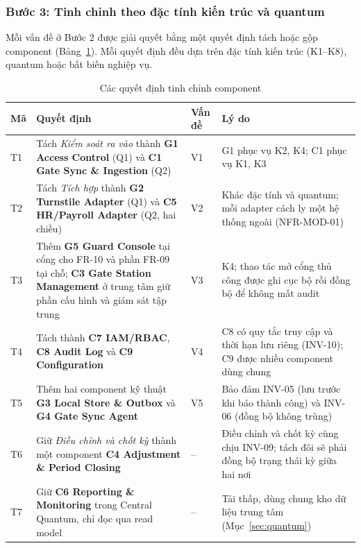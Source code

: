 \subsubsection{Bước 3: Tinh chỉnh theo đặc tính kiến trúc và quantum}\label{sec:logical-step3}
Mỗi vấn đề ở Bước 2 được giải quyết bằng một quyết định tách hoặc gộp component (Bảng~\ref{tab:logical-refinement}). Mỗi quyết định đều dựa trên đặc tính kiến trúc (K1--K8), quantum hoặc bất biến nghiệp vụ.

\begin{table}[H]
\centering
\caption{Các quyết định tinh chỉnh component}\label{tab:logical-refinement}
\small
\renewcommand{\arraystretch}{1.3}
\begin{tabularx}{\textwidth}{|>{\centering\arraybackslash}p{0.8cm}|>{\raggedright\arraybackslash}X|>{\centering\arraybackslash}p{1.4cm}|>{\raggedright\arraybackslash}p{4.4cm}|}
\hline
\textbf{Mã} & \textbf{Quyết định} & \textbf{Vấn đề} & \textbf{Lý do} \\
\hline
T1 & Tách \textit{Kiểm soát ra vào} thành \textbf{G1 Access Control} (Q1) và \textbf{C1 Gate Sync \& Ingestion} (Q2) & V1 & G1 phục vụ K2, K4; C1 phục vụ K1, K3 \\
\hline
T2 & Tách \textit{Tích hợp} thành \textbf{G2 Turnstile Adapter} (Q1) và \textbf{C5 HR/Payroll Adapter} (Q2, hai chiều) & V2 & Khác đặc tính và quantum; mỗi adapter cách ly một hệ thống ngoài (NFR-MOD-01) \\
\hline
T3 & Thêm \textbf{G5 Guard Console} tại cổng cho FR-10 và phần FR-09 tại chỗ; \textbf{C3 Gate Station Management} ở trung tâm giữ phần cấu hình và giám sát tập trung & V3 & K4; thao tác mở cổng thủ công được ghi cục bộ rồi đồng bộ để không mất audit \\
\hline
T4 & Tách thành \textbf{C7 IAM/RBAC}, \textbf{C8 Audit Log} và \textbf{C9 Configuration} & V4 & C8 có quy tắc truy cập và thời hạn lưu riêng (INV-10); C9 được nhiều component dùng chung \\
\hline
T5 & Thêm hai component kỹ thuật \textbf{G3 Local Store \& Outbox} và \textbf{G4 Gate Sync Agent} & V5 & Bảo đảm INV-05 (lưu trước khi báo thành công) và INV-06 (đồng bộ không trùng) \\
\hline
T6 & Giữ \textit{Điều chỉnh và chốt kỳ} thành một component \textbf{C4 Adjustment \& Period Closing} & -- & Điều chỉnh và chốt kỳ cùng chịu INV-09; tách đôi sẽ phải đồng bộ trạng thái kỳ giữa hai nơi \\
\hline
T7 & Giữ \textbf{C6 Reporting \& Monitoring} trong Central Quantum, chỉ đọc qua read model & -- & Tải thấp, dùng chung kho dữ liệu trung tâm (Mục~\ref{sec:quantum}) \\
\hline
\end{tabularx}
\end{table}

